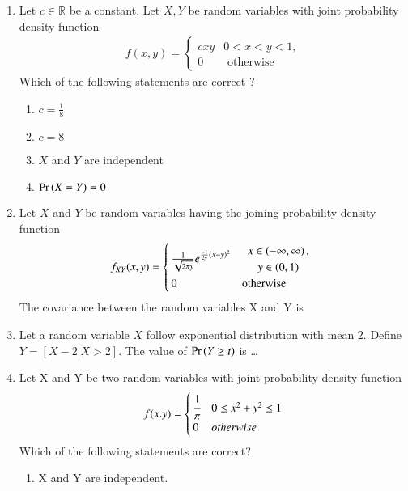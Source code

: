 \begin{enumerate}[label=\thesection.\arabic*.,ref=\thesection.\theenumi]
\item Let $ c \in \mathbb{R} $ be a constant. Let $ X, Y$ be random variables with joint probability density function 
\begin{align}
f(x,y)  = 
\begin{cases}
cxy &  0<x<y<1,
\\
0 & \text{ otherwise }
\end{cases}
\label{eq:: joint_pdf}
\end{align}
Which of the following statements are correct ?
\begin{enumerate}
    \item $c = \frac{1}{8}$
    \item $ c= 8$
    \item $X $ and $ Y$ are independent
    \item $\Pr\left(X= Y\right) = 0 $
\end{enumerate}
\solution

%
\item Let $X$ and $Y$ be random variables having the joining probability density function
\begin{align}
f_{XY}(x,y)=
\begin{cases}
\frac{1}{\sqrt{2\pi y}}e^{\frac{-1}{2y}(x-y)^2} & 
\begin{array}{c}
x \in \left(-\infty,\infty\right), 
\\
y \in \left(0, 1\right) 
\end{array}
\\
0 &\text{otherwise}
\end{cases}
\label{eq:twoD/2}
\end{align}
The covariance between the random variables X and Y is
\\
%
\solution
%
\item Let a random variable $X$ follow exponential distribution with mean 2. Define $Y=[X-2|X>2]$. The value of $\Pr\left(Y \geq t\right)$ is \dots
\\
%
\solution

%
\item Let X and Y be two random variables with joint probability density function
\begin{align*}
    f(x.y)=
    \begin{cases}
    \cfrac{1}{\pi} & 0\le x^2 + y^2 \le 1\\
    0 & otherwise
    \end{cases}
\end{align*}
Which of the following statements are correct?
\begin{enumerate}
    \item
    X and Y are independent.
    

\end{enumerate}
\end{enumerate}

